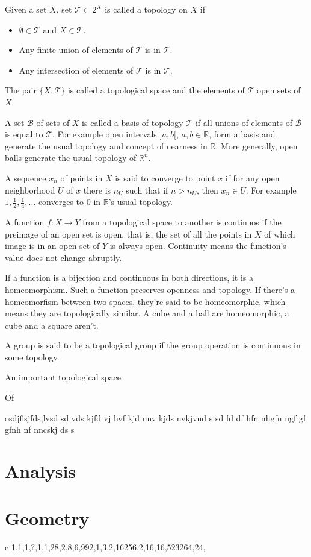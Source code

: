 \documentclass[11pt,oneside,%
]{memoir}
\newenvironment{eqna}{\begin{IEEEeqnarray}{c}}{\end{IEEEeqnarray}\ignorespacesafterend}
\newcommand{\RR}{\mathbb{R}}
\begin{document}
Given a set \(X\), set \(\mathcal{T}\subset2^X\) is called a topology on \(X\) if
\begin{itemize}
    \item \(\emptyset\in\mathcal{T}\) and \(X\in\mathcal{T}\).
    \item Any finite union of elements of \(\mathcal{T}\) is in \(\mathcal{T}\).
    \item Any intersection of elements of \(\mathcal{T}\) is in \(\mathcal{T}\).
\end{itemize}
The pair \(\lbrace X,\mathcal{T}\rbrace\) is called a topological space and the elements of \(\mathcal{T}\) open sets of \(X\).

A set \(\mathcal{B}\) of sets of \(X\) is called a basis of topology \(\mathcal{T}\) if all unions of elements of \(\mathcal{B}\) is equal to \(\mathcal{T}\). For example open intervals \(]a,b[\), \(a,b\in\RR\), form a basis and generate the usual topology and concept of nearness in \(\RR\). More generally, open balls generate the usual topology of \(\RR^n\).

A sequence \(x_n\) of points in \(X\) is said to converge to point \(x\) if for any open neighborhood \(U\) of \(x\) there is \(n_U\) such that if \(n>n_U\), then \(x_n\in U\). For example \(1,\frac{1}{2},\frac{1}{4},\dotsc\) converges to \(0\) in \(\RR\)'s usual topology.

A function \(f:X\rightarrow Y\) from a topological space to another is continuos if the preimage of an open set is open, that is, the set of all the points in \(X\) of which image is in an open set of \(Y\) is always open. Continuity means the function's value does not change abruptly.

If a function is a bijection and continuous in both directions, it is a homeomorphism. Such a function preserves openness and topology. If there's a homeomorfism between two spaces, they're said to be homeomorphic, which means they are topologically similar. A cube and a ball are homeomorphic, a cube and a square aren't.


A group is said to be a topological group if the group operation is continuous in some topology.

An important topological space


Of









osdjfisjfds;lvsd sd vds  kjfd vj hvf kjd nnv kjds nvkjvnd s sd fd   df hfn nhgfn ngf gf gfnh   nf nncskj ds s 
    

\section{Analysis}




\section{Geometry}

\begin{eqna}
    1,1,1,?,1,1,28,2,8,6,992,1,3,2,16256,2,16,16,523264,24,\dotsc\nonumber
\end{eqna}
\end{document}

